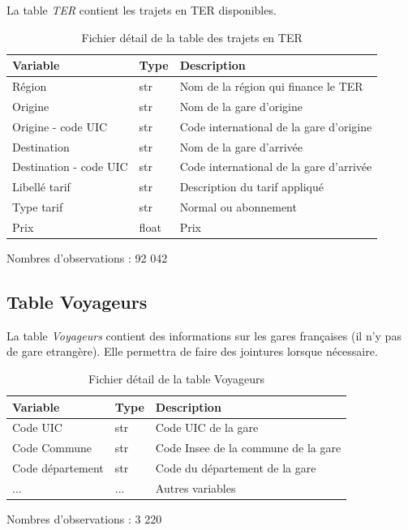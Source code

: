 \documentclass[
]{article}
\begin{document}
La table \emph{TER} contient les trajets en TER disponibles.

\begin{table}[H]

\caption{\label{tab:tableter}Fichier détail de la table des trajets en TER}
\centering
\begin{threeparttable}
\begin{tabular}[t]{l|l|l}
\hline
Variable & Type & Description\\
\hline
Région & str & Nom de la région qui finance le TER\\
\hline
Origine & str & Nom de la gare d’origine\\
\hline
Origine - code UIC & str & Code international de la gare d’origine\\
\hline
Destination & str & Nom de la gare d’arrivée\\
\hline
Destination - code UIC & str & Code international de la gare d’arrivée\\
\hline
Libellé tarif & str & Description du tarif appliqué\\
\hline
Type tarif & str & Normal ou abonnement\\
\hline
Prix & float & Prix\\
\hline
\end{tabular}
\begin{tablenotes}[para]
\item Nombres d'observations : 92 042
\end{tablenotes}
\end{threeparttable}
\end{table}

\hypertarget{table-voyageurs}{%
\subsection{Table Voyageurs}\label{table-voyageurs}}

La table \emph{Voyageurs} contient des informations sur les gares françaises (il n'y pas de gare etrangère). Elle permettra de faire des jointures lorsque nécessaire.

\begin{table}[H]

\caption{\label{tab:tablevoyageurs}Fichier détail de la table Voyageurs}
\centering
\begin{threeparttable}
\begin{tabular}[t]{l|l|l}
\hline
Variable & Type & Description\\
\hline
Code UIC & str & Code UIC de la gare\\
\hline
Code Commune & str & Code Insee de la commune de la gare\\
\hline
Code département & str & Code du département de la gare\\
\hline
... & ... & Autres variables\\
\hline
\end{tabular}
\begin{tablenotes}[para]
\item Nombres d'observations : 3 220
\end{tablenotes}
\end{threeparttable}
\end{table}
\end{document}
